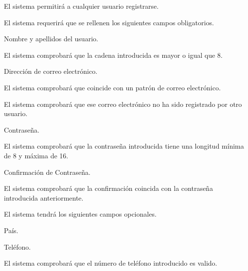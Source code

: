 \begin{enumitem}[label=\bfseries{RReg \arabic*.},leftmargin=*]
	\item El sistema permitirá a cualquier usuario registrarse.
	\begin{enumitem}[label*=\bfseries{\arabic*.}]
		\item El sistema requerirá que se rellenen los siguientes campos obligatorios.
		\begin{enumitem}[label*=\bfseries{\arabic*.}]
			\item Nombre y apellidos del usuario.
			\begin{enumitem}[label*=\bfseries{\arabic*.}]
				\item El sistema comprobará que la cadena introducida es mayor o igual que 8.
			\end{enumitem}
			\item Dirección de correo electrónico.
			\begin{enumitem}[label*=\bfseries{\arabic*.}]
				\item El sistema comprobará que coincide con un patrón de correo electrónico.
				\item El sistema comprobará que ese correo electrónico no ha sido registrado por otro usuario.
			\end{enumitem}
			\item Contraseña.
			\begin{enumitem}[label*=\bfseries{\arabic*.}]
				\item El sistema comprobará que la contraseña introducida tiene una longitud mínima de 8 y máxima de 16.
			\end{enumitem}
			\item Confirmación de Contraseña.
			\begin{enumitem}[label*=\bfseries{\arabic*.}]
				\item El sistema comprobará que la confirmación coincida con la contraseña introducida anteriormente.
			\end{enumitem}
		\end{enumitem}
		\item El sistema tendrá los siguientes campos opcionales.
		\begin{enumitem}[label*=\bfseries{\arabic*.}]
			\item País.
			\item Teléfono.
			\begin{enumitem}[label*=\bfseries{\arabic*.}]
				\item El sistema comprobará que el número de teléfono introducido es valido.

\end{enumitem}
\end{enumitem}
\end{enumitem}
\end{enumitem}
